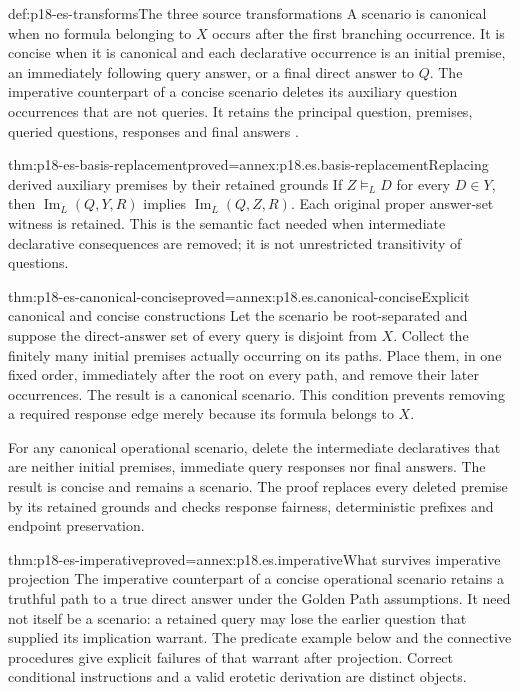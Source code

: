 \begin{hbdefinition}{def:p18-es-transforms}{The three source transformations}
A scenario is canonical when no formula belonging to \(X\) occurs after
the first branching occurrence. It is concise when it is canonical and
each declarative occurrence is an initial premise, an immediately following
query answer, or a final direct answer to \(Q\).
The imperative counterpart of a concise scenario deletes its auxiliary
question occurrences that are not queries. It retains the principal question,
premises, queried questions, responses and final answers
\cite[pp.~36--37]{Wisniewski2001QuestionsInferences}.
\end{hbdefinition}

\begin{hblemma}{thm:p18-es-basis-replacement}{proved=annex:p18.es.basis-replacement}{Replacing derived auxiliary premises by their retained grounds}
If \(Z\models_L D\) for every \(D\in Y\), then
\(\operatorname{Im}_L(Q,Y,R)\) implies
\(\operatorname{Im}_L(Q,Z,R)\). Each original proper answer-set witness
is retained. This is the semantic fact needed when intermediate declarative
consequences are removed; it is not unrestricted transitivity of questions.
\end{hblemma}

\begin{hbtheorem}{thm:p18-es-canonical-concise}{proved=annex:p18.es.canonical-concise}{Explicit canonical and concise constructions}
Let the scenario be root-separated and suppose the direct-answer set of
every query is disjoint from \(X\). Collect the finitely many initial
premises actually occurring on its paths. Place them, in one fixed order,
immediately after the root on every path, and remove their later occurrences.
The result is a canonical scenario. This condition prevents removing a
required response edge merely because its formula belongs to \(X\).

For any canonical operational scenario, delete the intermediate declaratives that are
neither initial premises, immediate query responses nor final answers.
The result is concise and remains a scenario. The proof replaces every
deleted premise by its retained grounds and checks response fairness,
deterministic prefixes and endpoint preservation.
\end{hbtheorem}

\begin{hbtheorem}{thm:p18-es-imperative}{proved=annex:p18.es.imperative}{What survives imperative projection}
The imperative counterpart of a concise operational scenario retains a
truthful path to a true direct answer under the Golden Path assumptions.
It need not itself be a scenario: a retained query may lose the earlier
question that supplied its implication warrant. The predicate example below
and the connective procedures give explicit failures of that warrant after
projection. Correct conditional instructions and a valid erotetic derivation
are distinct objects.
\end{hbtheorem}

